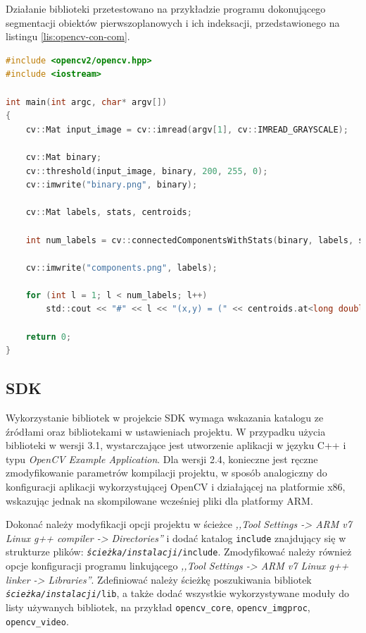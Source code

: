 Działanie biblioteki przetestowano na przykładzie programu dokonującego segmentacji obiektów pierwszoplanowych i ich indeksacji, przedstawionego na listingu \ref{lis:opencv-con-com}.

\begin{lstlisting}[language=C, breaklines=true, label=lis:opencv-con-com, caption=Aplikacja indeksująca obiekty pierwszoplanowe.]
#include <opencv2/opencv.hpp>
#include <iostream>

int main(int argc, char* argv[])
{
	cv::Mat input_image = cv::imread(argv[1], cv::IMREAD_GRAYSCALE);
	
	cv::Mat binary;
	cv::threshold(input_image, binary, 200, 255, 0);
	cv::imwrite("binary.png", binary);
	
	cv::Mat labels, stats, centroids;
	
	int num_labels = cv::connectedComponentsWithStats(binary, labels, stats, centroids);
	
	cv::imwrite("components.png", labels);
	
	for (int l = 1; l < num_labels; l++)
		std::cout << "#" << l << "(x,y) = (" << centroids.at<long double>(l, 0) << ", " << centroids.at<long double>(l, 1) << ")" << std::endl;
	
	return 0;
}
\end{lstlisting}
\subsection{SDK}
Wykorzystanie bibliotek w projekcie SDK wymaga wskazania katalogu ze źródłami oraz bibliotekami w ustawieniach projektu.
W przypadku użycia biblioteki w wersji 3.1, wystarczające jest utworzenie aplikacji w języku C++ i typu \textit{OpenCV Example Application}.
Dla wersji 2.4, konieczne jest ręczne zmodyfikowanie parametrów kompilacji projektu, w sposób analogiczny do konfiguracji aplikacji wykorzystującej OpenCV i działającej na platformie x86, wskazując jednak na skompilowane wcześniej pliki dla platformy ARM.

Dokonać należy modyfikacji opcji projektu w ścieżce \emph{,,Tool Settings -> ARM v7 Linux g++ compiler -> Directories''} i dodać katalog \texttt{include} znajdujący się w strukturze plików: \texttt{\textit{ścieżka/instalacji}/include}.
Zmodyfikować należy również opcje konfiguracji programu linkującego \emph{,,Tool Settings -> ARM v7 Linux g++ linker -> Libraries''}. Zdefiniować należy ścieżkę poszukiwania bibliotek \texttt{\textit{ścieżka/instalacji}/lib}, a także dodać wszystkie wykorzystywane moduły do listy używanych bibliotek, na przykład \texttt{opencv\_core}, \texttt{opencv\_imgproc}, \texttt{opencv\_video}.

